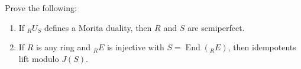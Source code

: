 Prove the following:
\begin{enumerate}
\item[(1)] If ${}_R U_S$ defines a Morita duality, then $R$ and $S$ are semiperfect.
\item[(2)] If $R$ is any ring and ${}_R E$ is injective with $S = \operatorname{End}({}_R E)$, then idempotents lift modulo $J(S)$.
\end{enumerate}
